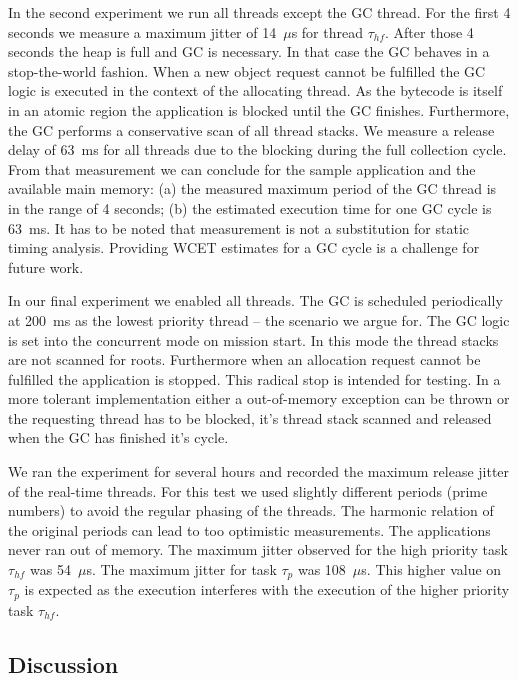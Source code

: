 In the second experiment we run all threads except the GC thread.
For the first 4 seconds we measure a maximum jitter of 14~$\mu$s for
thread $\tau_{hf}$. After those 4 seconds the heap is full and GC is
necessary. In that case the GC behaves in a stop-the-world fashion.
When a new object request cannot be fulfilled the GC logic is
executed in the context of the allocating thread. As the bytecode
 is itself in an atomic region the application is blocked
until the GC finishes. Furthermore, the GC performs a conservative
scan of all thread stacks. We measure a release delay of 63~ms for
all threads due to the blocking during the full collection cycle.
From that measurement we can conclude for the sample application and
the available main memory: (a) the measured maximum period of the GC
thread is in the range of 4 seconds; (b) the estimated execution
time for one GC cycle is 63~ms. It has to be noted that measurement
is not a substitution for static timing analysis. Providing WCET
estimates for a GC cycle is a challenge for future work.

In our final experiment we enabled all threads. The GC is scheduled
periodically at 200~ms as the lowest priority thread -- the scenario
we argue for. The GC logic is set into the concurrent mode on
mission start. In this mode the thread stacks are not scanned for
roots. Furthermore when an allocation request cannot be fulfilled
the application is stopped. This radical stop is intended for
testing. In a more tolerant implementation either a out-of-memory
exception can be thrown or the requesting thread has to be blocked,
it's thread stack scanned and released when the GC has finished it's
cycle.

We ran the experiment for several hours and recorded the maximum
release jitter of the real-time threads. For this test we used
slightly different periods (prime numbers) to avoid the regular
phasing of the threads. The harmonic relation of the original
periods can lead to too optimistic measurements. The applications
never ran out of memory. The maximum jitter observed for the high
priority task $\tau_{hf}$ was 54~$\mu$s. The maximum jitter for task
$\tau_{p}$ was 108~$\mu$s. This higher value on $\tau_{p}$ is
expected as the execution interferes with the execution of the
higher priority task $\tau_{hf}$.

\subsection{Discussion}


